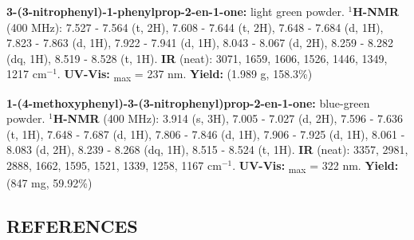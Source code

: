 \documentclass[12pt]{article}
\let\bf\textbf
\begin{document}
\noindent\bf{3-(3-nitrophenyl)-1-phenylprop-2-en-1-one:} light green powder. \bf{$^1$H-NMR} (400 MHz): \textdelta\hspace{0mm} 7.527 - 7.564 (t, 2H), 7.608 - 7.644 (t, 2H), 7.648 - 7.684 (d, 1H), 7.823 - 7.863 (d, 1H), 7.922 - 7.941 (d, 1H), 8.043 - 8.067 (d, 2H), 8.259 - 8.282 (dq, 1H), 8.519 - 8.528 (t, 1H). \bf{IR} (neat): 3071, 1659, 1606, 1526, 1446, 1349, 1217 cm$^{-1}$. \bf{UV-Vis:} \textlambda\textsubscript{max} = 237 nm. \bf{Yield:} (1.989 g, 158.3\%)

\noindent\bf{1-(4-methoxyphenyl)-3-(3-nitrophenyl)prop-2-en-1-one:} blue-green powder. \bf{$^1$H-NMR} (400 MHz): \textdelta\hspace{0mm} 3.914 (s, 3H), 7.005 - 7.027 (d, 2H), 7.596 - 7.636 (t, 1H), 7.648 - 7.687 (d, 1H), 7.806 - 7.846 (d, 1H), 7.906 - 7.925 (d, 1H), 8.061 - 8.083 (d, 2H), 8.239 - 8.268 (dq, 1H), 8.515 - 8.524 (t, 1H). \bf{IR} (neat): 3357, 2981, 2888, 1662, 1595, 1521, 1339, 1258, 1167 cm$^{-1}$. \bf{UV-Vis:} \textlambda\textsubscript{max} = 322 nm. \bf{Yield:} (847 mg, 59.92\%)

\newpage
\subsection*{REFERENCES}


\newpage
\end{document}
